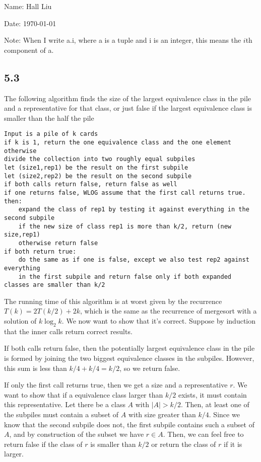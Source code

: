 \documentclass{article}
\begin{document}
Name: Hall Liu

Date: \today 
\vspace{0.5cm}

\noindent Note: When I write a.i, where a is a tuple and i is an integer, this means the $i$th component of a.

\subsection*{5.3}
The following algorithm finds the size of the largest equivalence class in the pile and a representative for that class, or just false if the largest equivalence class is smaller than the half the pile
\begin{verbatim}
Input is a pile of k cards
if k is 1, return the one equivalence class and the one element
otherwise
divide the collection into two roughly equal subpiles
let (size1,rep1) be the result on the first subpile
let (size2,rep2) be the result on the second subpile
if both calls return false, return false as well
if one returns false, WLOG assume that the first call returns true. then:
    expand the class of rep1 by testing it against everything in the second subpile
    if the new size of class rep1 is more than k/2, return (new size,rep1)
    otherwise return false
if both return true:
    do the same as if one is false, except we also test rep2 against everything 
    in the first subpile and return false only if both expanded classes are smaller than k/2
\end{verbatim}

The running time of this algorithm is at worst given by the recurrence $T(k)=2T(k/2)+2k$, which is the same as the recurrence of mergesort with a solution of $k\log_2k$. We now want to show that it's correct. Suppose by induction that the inner calls return correct results. 

If both calls return false, then the potentially largest equivalence class in the pile is formed by joining the two biggest equivalence classes in the subpiles. However, this sum is less than $k/4+k/4=k/2$, so we return false.

If only the first call returns true, then we get a size and a representative $r$. We want to show that if a equivalence class larger than $k/2$ exists, it must contain this representative. Let there be a class $A$ with $|A|>k/2$. Then, at least one of the subpiles must contain a subset of $A$ with size greater than $k/4$. Since we know that the second subpile does not, the first subpile contains such a subset of $A$, and by construction of the subset we have $r\in A$. Then, we can feel free to return false if the class of $r$ is smaller than $k/2$ or return the class of $r$ if it is larger.
\end{document}

